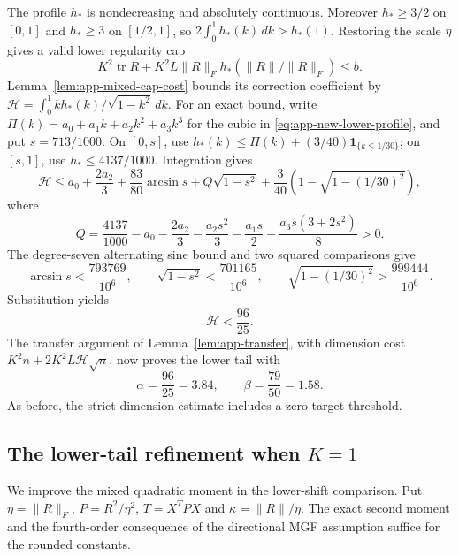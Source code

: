 \documentclass[11pt,a4paper]{article}
\numberwithin{equation}{section}
\begin{document}
The profile $h_*$ is nondecreasing and absolutely continuous.
Moreover $h_*\ge3/2$ on $[0,1]$ and $h_*\ge3$ on $[1/2,1]$, so
$2\int_0^1h_*(k)\,dk>h_*(1)$.
Restoring the scale $\eta$ gives a valid lower regularity cap
\[
 K^2\operatorname{tr}R+K^2L\|R\|_F
       h_*(\|R\|/\|R\|_F)\le b.
\]
Lemma~\ref{lem:app-mixed-cap-cost} bounds its correction coefficient by
$\mathcal H=\int_0^1kh_*(k)/\sqrt{1-k^2}\,dk$.
For an exact bound, write $\Pi(k)=a_0+a_1k+a_2k^2+a_3k^3$ for the
cubic in \eqref{eq:app-new-lower-profile}, and put $s=713/1000$.
On $[0,s]$, use
$h_*(k)\le\Pi(k)+(3/40)\mathbf1_{\{k\le1/30\}}$;
on $[s,1]$, use $h_*\le4137/1000$.
Integration gives
\[
 \mathcal H\le a_0+\frac{2a_2}{3}+\frac{83}{80}\arcsin s
 +Q\sqrt{1-s^2}+\frac3{40}\left(1-\sqrt{1-(1/30)^2}\right),
\]
where
\[
 Q=\frac{4137}{1000}-a_0-\frac{2a_2}{3}-\frac{a_2s^2}{3}
       -\frac{a_1s}{2}-\frac{a_3s(3+2s^2)}8>0.
\]
The degree-seven alternating sine bound and two squared comparisons give
\[
 \arcsin s<\frac{793769}{10^6},\qquad
 \sqrt{1-s^2}<\frac{701165}{10^6},\qquad
 \sqrt{1-(1/30)^2}>\frac{999444}{10^6}.
\]
Substitution yields
\[
 \mathcal H<\frac{96}{25}.
\]
The transfer argument of Lemma~\ref{lem:app-transfer}, with dimension
cost $K^2n+2K^2L\mathcal H\sqrt n$, now proves the lower tail with
\[
 \alpha=\frac{96}{25}=3.84,\qquad\beta=\frac{79}{50}=1.58.
\]
As before, the strict dimension estimate includes a zero target threshold.

\subsection{The lower-tail refinement when \texorpdfstring{$K=1$}{K=1}}
\label{app:K-one-proof}
We improve the mixed quadratic moment in the lower-shift comparison.
Put $\eta=\|R\|_F$, $P=R^2/\eta^2$, $T=X^TPX$ and
$\kappa=\|R\|/\eta$. The exact second moment and the fourth-order
consequence of the directional MGF assumption suffice for the rounded constants.
\end{document}
